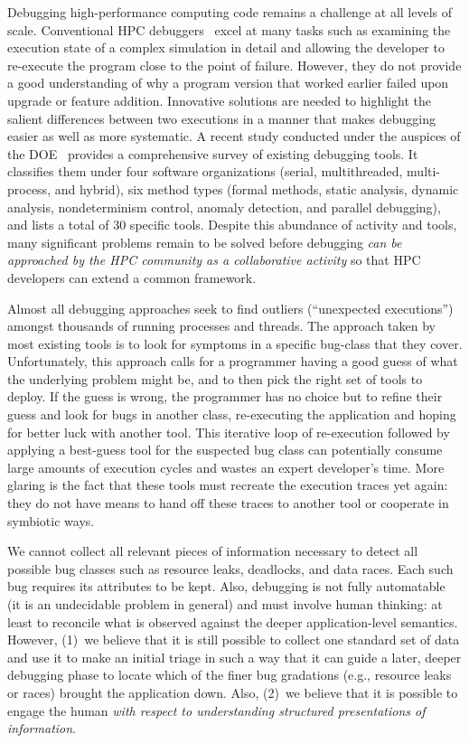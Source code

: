 Debugging high-performance computing code
remains a challenge at all levels of scale.
%
Conventional HPC debuggers~\cite{ddt,totalview}
excel at many tasks such as examining the execution
state of a complex simulation in detail
and allowing the developer to re-execute
the program close to the point of failure.
%
However, they do not provide a good understanding
of why a program version that worked earlier
failed upon upgrade or feature addition.
%
Innovative solutions are needed to highlight the
salient differences between two executions in a manner
that makes debugging easier as well as more systematic.
%
A recent study conducted under the auspices of the
DOE~\cite{hpcdoe}
provides a comprehensive survey
of existing debugging tools.
%
It classifies them under
four software organizations (serial, multithreaded,
multi-process, and hybrid), six
method types (formal methods, static analysis, dynamic
analysis, nondeterminism control, anomaly detection,
and parallel debugging), and lists a total of 30 specific
tools.
%
Despite this abundance of activity and tools, many
significant problems remain to be solved before debugging
{\em can be approached by the HPC community as a collaborative
activity} so that HPC developers can extend a common
framework.


Almost all debugging approaches seek to find outliers (``unexpected
executions'') amongst thousands of running processes and threads.
%
The approach taken by most existing tools is to
look for symptoms in a specific bug-class that they cover.
%
Unfortunately,
this approach calls for a programmer having a good guess of what
the underlying problem might be,
and to then pick the right set of tools to deploy.
%
If the guess is wrong, the programmer has no choice but to
refine their guess
and look for bugs in another class,
re-executing the application and hoping for
better luck with another tool.
%
This iterative loop of re-execution followed by applying a
best-guess tool for the suspected bug class can potentially consume
large amounts of execution cycles and wastes an
expert developer's time.
%
More glaring is the fact that these tools must recreate the
execution traces yet again: they do not have means to hand off
these traces to another tool or cooperate in symbiotic ways.



We cannot collect all relevant pieces of information
necessary to detect all possible bug classes such as
resource leaks, deadlocks, and data races.
%
Each such bug requires its attributes to be kept.
%
Also, debugging is not fully automatable (it is
an undecidable problem in general) and must involve human thinking:
at least to reconcile what is observed against the deeper application-level semantics.
%
However, (1)~we believe that it is still possible to collect one standard set
of data and use it to make an initial triage in such
a way that it can guide a later, deeper debugging phase to locate
which of the finer bug gradations (e.g., resource leaks or races) brought
the application down.
%
Also, (2)~we believe that it is possible to engage the human {\em with respect
to understanding structured presentations of information}.



